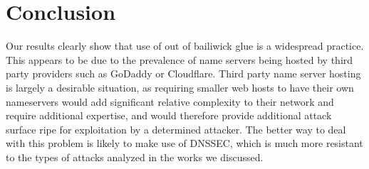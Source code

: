 \documentclass{idc_msc}
\begin{document}



\section{Conclusion}
Our results clearly show that use of out of bailiwick glue is a widespread practice. This appears to be due to the prevalence of name servers being hosted by third party providers such as GoDaddy or Cloudflare. Third party name server hosting is largely a desirable situation, as requiring smaller web hosts to have their own nameservers would add significant relative complexity to their network and require additional expertise, and would therefore provide additional attack surface ripe for exploitation by a determined attacker. The better way to deal with this problem is likely to make use of DNSSEC, which is much more resistant to the types of attacks analyzed in the works we discussed.
\end{document}
